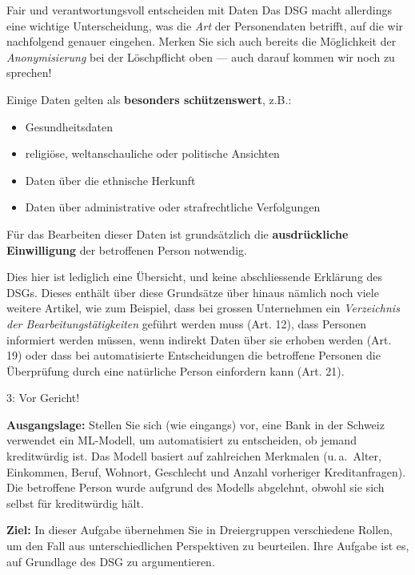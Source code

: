 \begin{lpu}{Fair und verantwortungsvoll entscheiden mit Daten}
Das DSG macht allerdings eine wichtige Unterscheidung, was die \textit{Art} der Personendaten betrifft, auf die wir nachfolgend genauer eingehen. Merken Sie sich auch bereits die Möglichkeit der \textit{Anonymisierung} bei der Löschpflicht oben — auch darauf kommen wir noch zu sprechen!

\begin{theorie}

Einige Daten gelten als \textbf{besonders schützenswert}, z.B.:

\begin{itemize}
  \item Gesundheitsdaten
  \item religiöse, weltanschauliche oder politische Ansichten
  \item Daten über die ethnische Herkunft
  \item Daten über administrative oder strafrechtliche Verfolgungen
\end{itemize}

Für das Bearbeiten dieser Daten ist grundsätzlich die \textbf{ausdrückliche Einwilligung} der betroffenen Person notwendig.
\end{theorie}

Dies hier ist lediglich eine Übersicht, und keine abschliessende Erklärung des DSGs. Dieses enthält über diese Grundsätze über hinaus nämlich noch viele weitere Artikel, wie zum Beispiel, dass bei grossen Unternehmen ein \textit{Verzeichnis der Bearbeitungstätigkeiten} geführt werden muss (Art. 12), dass Personen informiert werden müssen, wenn indirekt Daten über sie erhoben werden (Art. 19) oder dass bei automatisierte Entscheidungen die betroffene Personen die Überprüfung durch eine natürliche Person einfordern kann (Art. 21).

\begin{aufgabe}{3: Vor Gericht!}

\textbf{Ausgangslage:}  
Stellen Sie sich (wie eingangs) vor, eine Bank in der Schweiz verwendet ein ML-Modell, um automatisiert zu entscheiden, ob jemand kreditwürdig ist. Das Modell basiert auf zahlreichen Merkmalen (u.\,a.\ Alter, Einkommen, Beruf, Wohnort, Geschlecht und Anzahl vorheriger Kreditanfragen). Die betroffene Person wurde aufgrund des Modells abgelehnt, obwohl sie sich selbst für kreditwürdig hält.

\textbf{Ziel:}  
In dieser Aufgabe übernehmen Sie in Dreiergruppen verschiedene Rollen, um den Fall aus unterschiedlichen Perspektiven zu beurteilen. Ihre Aufgabe ist es, auf Grundlage des DSG zu argumentieren.


\end{aufgabe}
\end{lpu}
